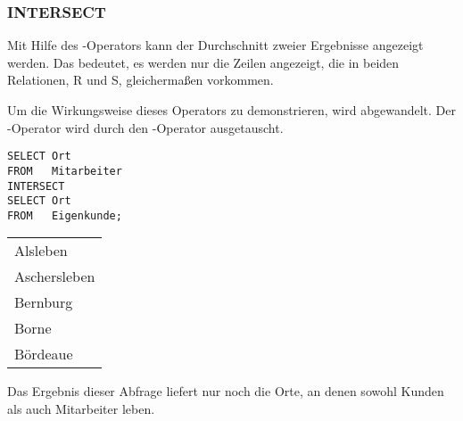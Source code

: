         \subsubsection{INTERSECT}
          Mit Hilfe des -Operators kann der Durchschnitt zweier Ergebnisse angezeigt werden. Das bedeutet, es werden nur die Zeilen angezeigt, die in beiden Relationen, R und S, gleichermaßen vorkommen.

          Um die Wirkungsweise dieses Operators zu demonstrieren, wird  abgewandelt. Der -Operator wird durch den -Operator ausgetauscht.


          \begin{lstlisting}[language=oracle_sql,caption={Orte, an denen sowohl Kunden als auch Mitarbeiter leben},label=sql04_25]
SELECT Ort
FROM   Mitarbeiter
INTERSECT
SELECT Ort
FROM   Eigenkunde;
          \end{lstlisting}
\clearpage
          \begin{center}
            \begin{small}
              \tablehead{}
              \begin{msoraclesql}
                \begin{supertabular}{l}
                  Alsleben \\
                  Aschersleben \\
                  Bernburg \\
                  Borne \\
                  Bördeaue \\
                \end{supertabular}
              \end{msoraclesql}
            \end{small}
          \end{center}
          Das Ergebnis dieser Abfrage liefert nur noch die Orte, an denen sowohl Kunden als auch Mitarbeiter leben.
